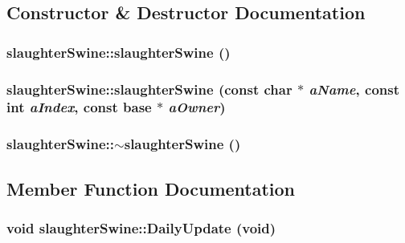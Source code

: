 \subsection{Constructor \& Destructor Documentation}
\hypertarget{classslaughter_swine_a42dc4564b6b195e818c4a66a48569a8d}{
\subsubsection[{slaughterSwine}]{\setlength{\rightskip}{0pt plus 5cm}slaughterSwine::slaughterSwine ()}}
\label{classslaughter_swine_a42dc4564b6b195e818c4a66a48569a8d}
\hypertarget{classslaughter_swine_afc9e93fc1040fe9f08e50a3d7d961f46}{
\subsubsection[{slaughterSwine}]{\setlength{\rightskip}{0pt plus 5cm}slaughterSwine::slaughterSwine (const char $\ast$ {\em aName}, \/  const int {\em aIndex}, \/  const {\bf base} $\ast$ {\em aOwner})}}
\label{classslaughter_swine_afc9e93fc1040fe9f08e50a3d7d961f46}
\hypertarget{classslaughter_swine_a200b98ef310cc3805dba1e4c79e2ccac}{
\subsubsection[{$\sim$slaughterSwine}]{\setlength{\rightskip}{0pt plus 5cm}slaughterSwine::$\sim$slaughterSwine ()}}
\label{classslaughter_swine_a200b98ef310cc3805dba1e4c79e2ccac}


\subsection{Member Function Documentation}
\hypertarget{classslaughter_swine_a878b44d9124ee9a550f86ecf353e1401}{
\subsubsection[{DailyUpdate}]{\setlength{\rightskip}{0pt plus 5cm}void slaughterSwine::DailyUpdate (void)}}
\label{classslaughter_swine_a878b44d9124ee9a550f86ecf353e1401}


